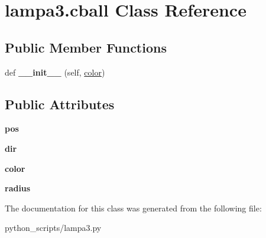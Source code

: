 \hypertarget{classlampa3_1_1cball}{}\section{lampa3.\+cball Class Reference}
\label{classlampa3_1_1cball}
\subsection*{Public Member Functions}
\begin{DoxyCompactItemize}
\item 
\hypertarget{classlampa3_1_1cball_a07991d683ccb1f1f86f1117b7507f6c3}{}def {\bfseries \+\_\+\+\_\+init\+\_\+\+\_\+} (self, \hyperlink{structcolor}{color})\label{classlampa3_1_1cball_a07991d683ccb1f1f86f1117b7507f6c3}

\end{DoxyCompactItemize}
\subsection*{Public Attributes}
\begin{DoxyCompactItemize}
\item 
\hypertarget{classlampa3_1_1cball_a9107f79e11da1bdfd757221b1f5de6bc}{}{\bfseries pos}\label{classlampa3_1_1cball_a9107f79e11da1bdfd757221b1f5de6bc}

\item 
\hypertarget{classlampa3_1_1cball_a8bd7b85a3efa502302651ba6f2e6ba52}{}{\bfseries dir}\label{classlampa3_1_1cball_a8bd7b85a3efa502302651ba6f2e6ba52}

\item 
\hypertarget{classlampa3_1_1cball_a1c63ffd2499a64b785636149398010fb}{}{\bfseries color}\label{classlampa3_1_1cball_a1c63ffd2499a64b785636149398010fb}

\item 
\hypertarget{classlampa3_1_1cball_a6af41e5c82a7caccd638fc14e3caf3f9}{}{\bfseries radius}\label{classlampa3_1_1cball_a6af41e5c82a7caccd638fc14e3caf3f9}

\end{DoxyCompactItemize}


The documentation for this class was generated from the following file\+:\begin{DoxyCompactItemize}
\item 
python\+\_\+scripts/lampa3.\+py\end{DoxyCompactItemize}
